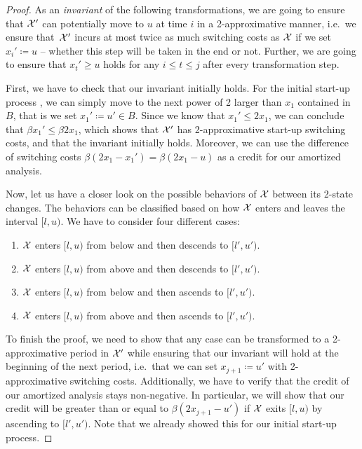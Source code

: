\begin{proof}
As an \emph{invariant} of the following transformations, we are going to ensure that $\mathcal{X}'$ can potentially move to $u$ at time $i$ in a 2-approximative manner, i.e.\ we ensure that~$\mathcal{X}'$ incurs at most twice as much switching costs as $\mathcal{X}$ if we set $x_i'\coloneqq u$ -- whether this step will be taken in the end or not. Further, we are going to ensure that $x_t'\ge u$ holds for any $i\le t\le j$ after every transformation step. 
	
First, we have to check that our invariant initially holds. For the initial start-up process , we can simply move to the next power of 2 larger than $x_1$ contained in $B$, that is we set $x_1'\coloneqq u'\in B$. Since we know that $x_1'\le2x_1$, we can conclude that $\beta x_1'\le\beta 2x_1$, which shows that $\mathcal{X}'$ has 2-approximative start-up switching costs, and that the invariant initially holds. Moreover, we can use the difference of switching costs $\beta(2x_1-x_1')=\beta(2x_1-u)$ as a credit for our amortized analysis.

Now, let us have a closer look on the possible behaviors of $\mathcal{X}$ between its 2-state changes. The behaviors can be classified based on how $\mathcal{X}$ enters and leaves the interval $[l,u)$. We have to consider four different cases:
\begin{enumerate}[label=(\alph*)]
	\item $\mathcal{X}$ enters $[l,u)$ from below and then descends to $[l',u')$.\label{itm:schedule_behavior_up_down}
	\item $\mathcal{X}$ enters $[l,u)$ from above and then descends to $[l',u')$.\label{itm:schedule_behavior_down_down}
	\item $\mathcal{X}$ enters $[l,u)$ from below and then ascends to $[l',u')$.\label{itm:schedule_behavior_up_up} 
	\item $\mathcal{X}$ enters $[l,u)$ from above and then ascends to $[l',u')$.\label{itm:schedule_behavior_down_up} 
\end{enumerate}
To finish the proof, we need to show that any case can be transformed to a 2-approximative period in $\mathcal{X}'$ while ensuring that our invariant will hold at the beginning of the next period, i.e.\ that we can set $x_{j+1}\coloneqq u'$ with 2-approximative switching costs. Additionally, we have to verify that the credit of our amortized analysis stays non-negative. In particular, we will show that our credit will be greater than or equal to $\beta(2x_{j+1}-u')$ if $\mathcal{X}$ exits $[l,u)$ by ascending to $[l',u')$. Note that we already showed this for our initial start-up process.
	

\end{proof}
